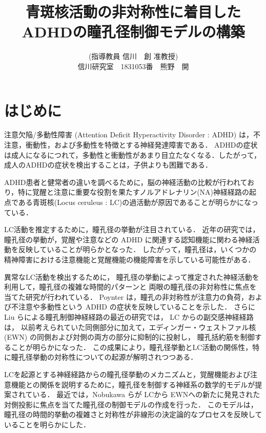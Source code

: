 \documentclass[10pt,twocolumn,a4j]{jsarticle}
\begin{document}
\title{青斑核活動の非対称性に着目したADHDの瞳孔径制御モデルの構築}
\author{(指導教員 信川　創 准教授)　

信川研究室　1831053番　熊野　開}
\date{}

\maketitle


\section{はじめに}
注意欠陥/多動性障害 (Attention Deficit Hyperactivity Disorder : ADHD) は，不注意，衝動性，および多動性を特徴とする神経発達障害である．
ADHDの症状は成人になるにつれて，多動性と衝動性があまり目立たなくなる．したがって，成人のADHDの症状を検出することは，子供よりも困難である．

ADHD患者と健常者の違いを調べるために，脳の神経活動の比較が行われており，特に覚醒と注意に重要な役割を果たすノルアドレナリン(NA)神経経路の起点である青斑核(Locus ceruleus : LC)の過活動が原因であることが明らかになっている\cite{rowe2005biophysical}．

LC活動を推定するために，瞳孔径の挙動が注目されている．
近年の研究では，瞳孔径の挙動が，覚醒や注意などの ADHD に関連する認知機能に関わる神経活動を反映していることが明らかとなった\cite{rajkowski1993correlations}．
したがって，瞳孔径は，いくつかの精神障害における注意機能と覚醒機能の機能障害を示している可能性がある．

異常なLC活動を検出するために，
瞳孔径の挙動によって推定された神経活動を利用して，瞳孔径の複雑な時間的パターンと
両眼の瞳孔径の非対称性に焦点を当てた研究が行われている．
Poynter は，瞳孔の非対称性が注意力の負荷，および不注意や多動性という ADHD の症状を反映していることを示した\cite{poynter2017pupil}．
さらにLiu らによる瞳孔制御神経経路の最近の研究では， LC からの副交感神経経路は，
以前考えられていた同側部分に加えて，エディンガー・ウェストファル核 (EWN) の同側および対側の両方の部分に抑制的に投射し，
瞳孔括約筋を制御することが明らかになった\cite{liu2017dynamic}．
この成果により，瞳孔径挙動とLC活動の関係性，特に瞳孔径挙動の対称性についての起源が解明されつつある\cite{liu2017dynamic}．

LCを起源とする神経経路からの瞳孔径挙動のメカニズムと，覚醒機能および注意機能との関係を説明するために，瞳孔径を制御する神経系の数学的モデルが提案されている．
最近では，Nobukawa らが LCから EWNへの新たに発見された対側投影に焦点を当てた瞳孔径の制御モデルの作成を行った．
このモデルは，瞳孔径の時間的挙動の複雑さと対称性が非線形の決定論的なプロセスを反映していることを明らかにした\cite{10.3389/fphys.2021.614479}．
\end{document}
